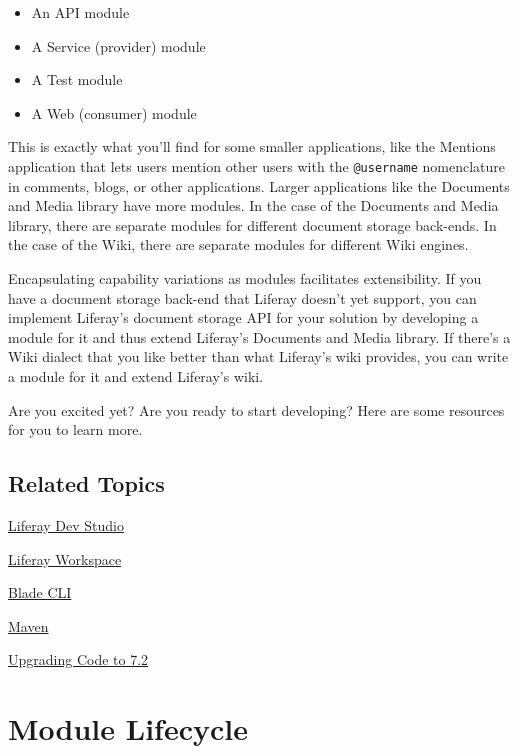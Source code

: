 \begin{itemize}
\tightlist
\item
  An API module
\item
  A Service (provider) module
\item
  A Test module
\item
  A Web (consumer) module
\end{itemize}

This is exactly what you'll find for some smaller applications, like the
Mentions application that lets users mention other users with the
\texttt{@username} nomenclature in comments, blogs, or other
applications. Larger applications like the Documents and Media library
have more modules. In the case of the Documents and Media library, there
are separate modules for different document storage back-ends. In the
case of the Wiki, there are separate modules for different Wiki engines.

Encapsulating capability variations as modules facilitates
extensibility. If you have a document storage back-end that Liferay
doesn't yet support, you can implement Liferay's document storage API
for your solution by developing a module for it and thus extend
Liferay's Documents and Media library. If there's a Wiki dialect that
you like better than what Liferay's wiki provides, you can write a
module for it and extend Liferay's wiki.

Are you excited yet? Are you ready to start developing? Here are some
resources for you to learn more.

\section{Related Topics}\label{related-topics-10}

\href{/docs/7-2/reference/-/knowledge_base/r/liferay-dev-studio}{Liferay
Dev Studio}

\href{/docs/7-2/reference/-/knowledge_base/r/liferay-workspace}{Liferay
Workspace}

\href{/docs/7-2/reference/-/knowledge_base/r/blade-cli}{Blade CLI}

\href{/docs/7-2/reference/-/knowledge_base/r/maven}{Maven}

\href{/docs/7-2/tutorials/-/knowledge_base/t/upgrading-code-to-product-ver}{Upgrading
Code to 7.2}

\chapter{Module Lifecycle}\label{module-lifecycle}

